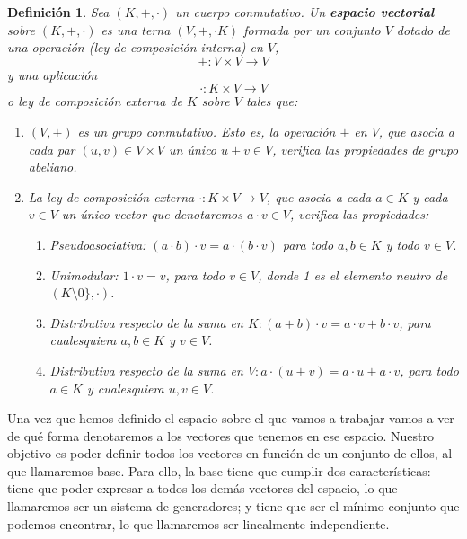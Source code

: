 \documentclass[a4paper,11pt, oneside]{book}
\newtheorem{defi}{Definición}
\begin{document}
\begin{defi}
	Sea $(K, +, \cdot )$ un cuerpo conmutativo. Un \textbf{espacio vectorial} sobre $(K, +, \cdot )$ es una terna $(V, +, \cdot K)$ formada por un conjunto $V$ dotado de una operación (ley de composición interna) en $V$,
	\begin{equation}
	+ : V \times V \rightarrow V
	\end{equation}
	y una aplicación
	\begin{equation}
	\cdot  : K \times V \rightarrow V
	\end{equation}
	o ley de composición externa de $K$ sobre $V$ tales que:
	\begin{enumerate}
	\item $(V, +)$ es un grupo conmutativo. Esto es, la operación $+$ en $V$, que asocia a cada par $(u,v) \in V \times V$ un único $u+v \in V$, verifica las propiedades de grupo abeliano.
	\item La ley de composición externa $\cdot  : K \times V \rightarrow V$, que asocia a cada $a \in K$ y cada $
	v \in V$ un único vector que denotaremos $a \cdot  v \in V$, verifica las propiedades:
	\begin{enumerate}
		\item Pseudoasociativa: $(a \cdot b)\cdot v = a\cdot (b\cdot v)$ para todo $a,b \in K$ y todo $v \in V$.
		\item Unimodular: $1\cdot v = v$, para todo $v \in V$, donde 1 es el elemento neutro de $(K\setminus0\},\cdot )$.
		\item Distributiva respecto de la suma en $K:(a+b)\cdot v=a\cdot v+b\cdot v$, para cualesquiera $a,b \in K$ y $v \in V$.
		\item Distributiva respecto de la suma en $V: a\cdot (u+v) = a\cdot u+a\cdot v$, para todo $a \in K$ y cualesquiera $u,v \in V$.
	\end{enumerate}
	\end{enumerate}
\end{defi}

Una vez que hemos definido el espacio sobre el que vamos a trabajar vamos a ver de qué forma denotaremos a los vectores que tenemos en ese espacio. Nuestro objetivo es poder definir todos los vectores en función de un conjunto de ellos, al que llamaremos base. Para ello, la base tiene que cumplir dos características: tiene que poder expresar a todos los demás vectores del espacio, lo que llamaremos ser un sistema de generadores; y tiene que ser el mínimo conjunto que podemos encontrar, lo que llamaremos ser linealmente independiente.
\end{document}
